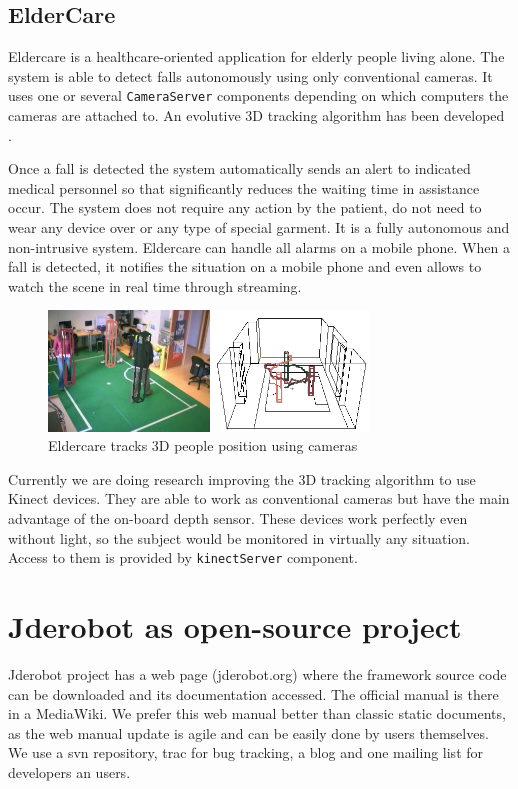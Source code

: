 \documentclass[twocolumn]{svjour3}          %
\begin{document}
\subsection{ElderCare}

Eldercare is a healthcare-oriented application for elderly people living alone. The system is able to detect falls autonomously using only conventional cameras. It uses one or several \texttt{CameraServer} components depending on which computers the cameras are attached to. An evolutive 3D tracking algorithm has been developed \cite{canas2011}.

Once a fall is detected the system automatically sends an alert to indicated medical personnel so that significantly reduces the waiting time in assistance occur. The system does not require any action by the patient, do not need to wear any device over or any type of special garment. It is a fully autonomous and non-intrusive system. Eldercare can handle all alarms on a mobile phone. When a fall is detected, it notifies the situation on a mobile phone and even allows to watch the scene in real time through streaming.

\begin{figure}
\includegraphics[width=8.5cm]{figs/eldercare.png}
\caption{Eldercare tracks 3D people position using cameras}
\label{fig:eldercare}
\end{figure}

Currently we are doing research improving the 3D tracking algorithm to use Kinect devices. They are able to work as conventional cameras but have the main advantage of the on-board depth sensor. These devices work perfectly even without light, so the subject would be monitored in virtually any situation. Access to them is provided by \texttt{kinectServer} component.

\section{Jderobot as open-source project}

Jderobot project has a web page (jderobot.org) where the framework source code can be downloaded and its documentation accessed. The official manual is there in a MediaWiki. We prefer this web manual better than classic static documents, as the web manual update is agile and can be easily done by users themselves. We use a svn repository, trac for bug tracking, a blog and one mailing list for developers an users.
\end{document}
